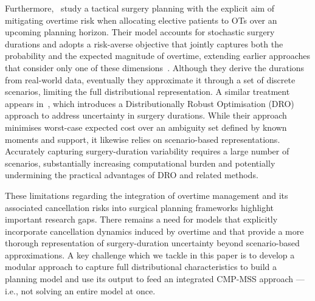 Furthermore,~\citet{Zhang2020} study a tactical surgery planning with the explicit aim of mitigating overtime risk when allocating elective patients to OTs over an upcoming planning horizon. 
Their model accounts for stochastic surgery durations and adopts a risk-averse objective that jointly captures both the probability and the expected magnitude of overtime, extending earlier approaches that consider only one of these dimensions~\citep{Shylo2013, Rath2017}.
Although they derive the durations from real-world data, eventually they approximate it through a set of discrete scenarios, limiting the full distributional representation.
A similar treatment appears in~\citet{Shehadeh2026}, which introduces a Distributionally Robust Optimisation (DRO) approach to address uncertainty in surgery durations.
While their approach minimises worst-case expected cost over an ambiguity set defined by known moments and support, it likewise relies on scenario-based representations.
Accurately capturing surgery-duration variability requires a large number of scenarios, substantially increasing computational burden and potentially undermining the practical advantages of DRO and related methods.

These limitations regarding the integration of overtime management and its associated cancellation risks into surgical planning frameworks highlight important research gaps.
There remains a need for models that explicitly incorporate cancellation dynamics induced by overtime and that provide a more thorough representation of surgery-duration uncertainty beyond scenario-based approximations. A key challenge which we tackle in this paper is to develop a modular approach to capture full distributional characteristics to build a planning model and use its output to feed an integrated CMP-MSS approach --- i.e., not solving an entire model at once.

